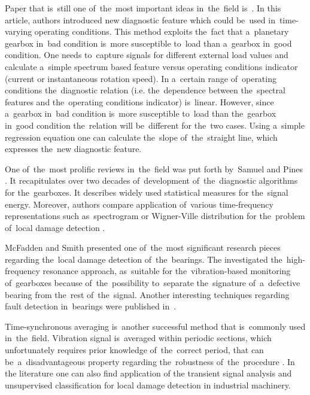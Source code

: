 Paper that is~still one of~the~most important ideas in~the~field is~\cite{bartelmus}. In this article, authors introduced new diagnostic feature which could be~used in~time-varying operating conditions. This method exploits the~fact that a~planetary gearbox in~bad condition is~more susceptible to~load than a~gearbox in~good condition. One needs to~capture signals for different external load values and calculate a~simple spectrum based feature versus operating conditions indicator (current or instantaneous rotation speed). In a~certain range of~operating conditions the~diagnostic relation (i.e. the~dependence between the~spectral features and the~operating conditions indicator) is~linear. However, since a~gearbox in~bad condition is~more susceptible to~load than the~gearbox in~good condition the~relation will be~different for the~two cases. Using a~simple regression equation one can calculate the~slope of~the~straight line, which expresses the~new diagnostic feature.

One of~the~most prolific reviews in~the~field was put forth by~Samuel and Pines \cite{samuel_pines}. It recapitulates over two decades of~development of~the~diagnostic algorithms for the~gearboxes. It describes widely used statistical measures for the~signal energy. Moreover, authors compare application of~various time-frequency representations such as~spectrogram or Wigner-Ville distribution for the~problem of~local damage detection \cite{forrester, forrester2, samuel2, nasa1}. 

McFadden and Smith \cite{mcfadden_bearings} presented one of~the~most significant research pieces regarding the~local damage detection of~the~bearings. The investigated the~high-frequency resonance approach, as~suitable for the~vibration-based monitoring of~gearboxes because of~the~possibility to~separate the~signature of~a~defective bearing from the~rest of~the~signal. Another interesting techniques regarding fault detection in~bearings were published in~\cite{AYE20151779,COCCONCELLI2012667}.

Time-synchronous averaging is~another successful method that is~commonly used in~the~field. Vibration signal is~averaged within periodic sections, which unfortunately requires prior knowledge of~the~correct period, that can be~a~disadvantageous property regarding the~robustness of~the~procedure \cite{braun_tsa,Wang201774}.  In the literature one can also find application of the transient signal analysis and unsupervised classification \cite{TIMUSK20081724} for local damage detection in industrial machinery. 

